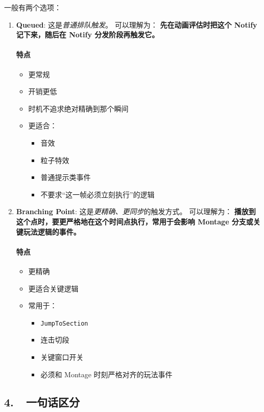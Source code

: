 一般有两个选项：
\begin{enumerate} 
	\item \textbf{Queued}:		这是\emph{普通排队触发}。		可以理解为：		\textbf{先在动画评估时把这个 Notify 记下来，随后在 Notify 分发阶段再触发它。}
	
	\paragraph{特点}
	\begin{itemize}
		\item 更常规
		\item 开销更低
		\item 时机不追求绝对精确到那个瞬间
		\item 更适合：
		\begin{itemize}
			\item 音效
			\item 粒子特效
			\item 普通提示类事件
			\item 不要求“这一帧必须立刻执行”的逻辑
		\end{itemize}
	\end{itemize}
	
	\item \textbf{Branching Point}:	这是\emph{更精确、更同步}的触发方式。	可以理解为：
	\textbf{播放到这个点时，要更严格地在这个时间点执行，常用于会影响 Montage 分支或关键玩法逻辑的事件。}
	
	
	\paragraph{特点}
	\begin{itemize}
		\item 更精确
		\item 更适合关键逻辑
		\item 常用于：
		\begin{itemize}
			\item \texttt{JumpToSection}
			\item 连击切段
			\item 关键窗口开关
			\item 必须和 Montage 时刻严格对齐的玩法事件
		\end{itemize}
	\end{itemize}
\end{enumerate}
\subsection*{4.\ \ 一句话区分}

